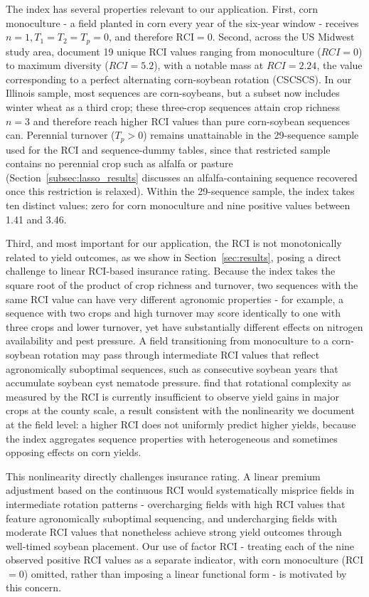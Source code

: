 \documentclass[12pt,letterpaper]{article}
\theoremstyle{remark}
\theoremstyle{remark}
\theoremstyle{plain}
\theoremstyle{definition}
\begin{document}
The index has several properties relevant to our application. First, corn monoculture - a field planted in corn every year of the six-year window - receives $n=1, T_{1}=T_{2}=T_{p}=0$, and therefore $\text{RCI} = 0$. Second, across the US Midwest study area, \citet{socolar2021} document 19 unique RCI values ranging from monoculture ($RCI = 0$) to maximum diversity ($RCI = 5.2$), with a notable mass at $RCI = 2.24$, the value corresponding to a perfect alternating corn-soybean rotation (CSCSCS). In our Illinois sample, most sequences are corn-soybeans, but a subset now includes winter wheat as a third crop; these three-crop sequences attain crop richness $n = 3$ and therefore reach higher RCI values than pure corn-soybean sequences can. Perennial turnover ($T_{p} > 0$) remains unattainable in the 29-sequence sample used for the RCI and sequence-dummy tables, since that restricted sample contains no perennial crop such as alfalfa or pasture (Section~\ref{subsec:lasso_results} discusses an alfalfa-containing sequence recovered once this restriction is relaxed). Within the 29-sequence sample, the index takes ten distinct values: zero for corn monoculture and nine positive values between 1.41 and 3.46.

Third, and most important for our application, the RCI is not monotonically related to yield outcomes, as we show in Section~\ref{sec:results}, posing a direct challenge to linear RCI-based insurance rating. Because the index takes the square root of the product of crop richness and turnover, two sequences with the same RCI value can have very different agronomic properties - for example, a sequence with two crops and high turnover may score identically to one with three crops and lower turnover, yet have substantially different effects on nitrogen availability and pest pressure. A field transitioning from monoculture to a corn-soybean rotation may pass through intermediate RCI values that reflect agronomically suboptimal sequences, such as consecutive soybean years that accumulate soybean cyst nematode pressure. \citet{burchfield2024} find that rotational complexity as measured by the RCI is currently insufficient to observe yield gains in major crops at the county scale, a result consistent with the nonlinearity we document at the field level: a higher RCI does not uniformly predict higher yields, because the index aggregates sequence properties with heterogeneous and sometimes opposing effects on corn yields.

This nonlinearity directly challenges insurance rating. A linear premium adjustment based on the continuous RCI would systematically misprice fields in intermediate rotation patterns - overcharging fields with high RCI values that feature agronomically suboptimal sequencing, and undercharging fields with moderate RCI values that nonetheless achieve strong yield outcomes through well-timed soybean placement. Our use of factor RCI - treating each of the nine observed positive RCI values as a separate indicator, with corn monoculture (RCI $= 0$) omitted, rather than imposing a linear functional form - is motivated by this concern.
\end{document}
